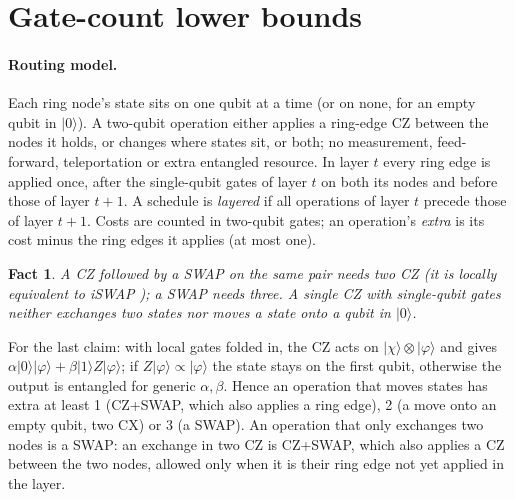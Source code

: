 \documentclass[11pt]{article}
\newtheorem{fact}{Fact}
\begin{document}
\section{Gate-count lower bounds}

\paragraph{Routing model.} Each ring node's state sits on one qubit at a time (or on none, for an empty qubit in
$|0\rangle$). A two-qubit operation either applies a ring-edge CZ between the nodes it holds, or changes where states
sit, or both; no measurement, feed-forward, teleportation or extra entangled resource. In layer $t$ every ring edge is
applied once, after the single-qubit gates of layer $t$ on both its nodes and before those of layer $t+1$. A schedule is
\emph{layered} if all operations of layer $t$ precede those of layer $t+1$. Costs are counted in two-qubit gates; an
operation's \emph{extra} is its cost minus the ring edges it applies (at most one).

\begin{fact}
A CZ followed by a SWAP on the same pair needs two CZ (it is locally equivalent to iSWAP \cite{vatan2004,shende2004});
a SWAP needs three. A single CZ with single-qubit gates neither exchanges two states nor moves a state onto a qubit in
$|0\rangle$.
\end{fact}
\noindent For the last claim: with local gates folded in, the CZ acts on $|\chi\rangle\otimes|\varphi\rangle$ and gives
$\alpha|0\rangle|\varphi\rangle + \beta|1\rangle Z|\varphi\rangle$; if $Z|\varphi\rangle \propto |\varphi\rangle$ the
state stays on the first qubit, otherwise the output is entangled for generic $\alpha,\beta$. Hence an operation that
moves states has extra at least 1 (CZ+SWAP, which also applies a ring edge), 2 (a move onto an empty qubit, two CX) or
3 (a SWAP). An operation that only exchanges two nodes is a SWAP: an exchange in two CZ is CZ+SWAP, which also applies a
CZ between the two nodes, allowed only when it is their ring edge not yet applied in the layer.
\end{document}
